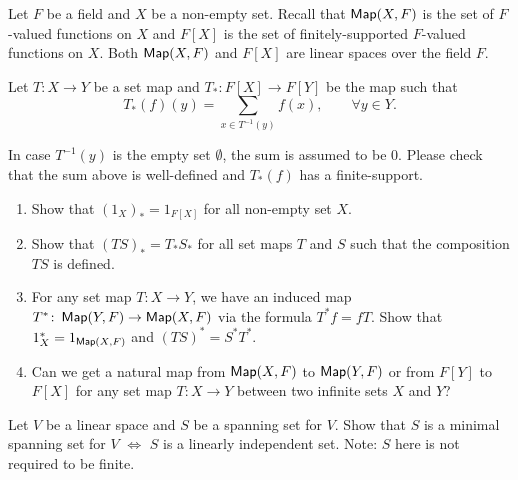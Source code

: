 \begin{problem}\label{prob:function_space_homomorphisms}
  Let $F$ be a field and $X$ be a non-empty set. Recall that $\operatorname{\text{\normalfont\sffamily Map}}(X, F)$ is the set of $F$-valued functions on $X$ and $F[X]$ is the set of finitely-supported $F$-valued functions on $X$. Both $\operatorname{\text{\normalfont\sffamily Map}}(X, F)$ and $F[X]$ are linear spaces over the field $F$.

  Let $T \colon X \to Y$ be a set map and $T_* \colon F[X] \to F[Y]$ be the map such that 
  \[
      T_*(f)(y) = \sum_{x \in T^{-1}(y)} f(x), \qquad \forall y \in Y.
  \]

  In case $T^{-1}(y)$ is the empty set $\emptyset$, the sum is assumed to be 0. Please check that the sum above is well-defined and $T_*(f)$ has a finite-support.
  \begin{enumerate}
    \item Show that ${(1_X)}_* = 1_{F[X]}$ for all non-empty set $X$.
    \item Show that ${(TS)}_* = T_* S_*$ for all set maps $T$ and $S$ such that the composition $TS$ is defined.
    \item For any set map $T \colon X \to Y$, we have an induced map $T^* \colon \operatorname{\text{\normalfont\sffamily Map}}(Y, F) \to \operatorname{\text{\normalfont\sffamily Map}}(X, F)$ via the formula $T^*f = fT$. Show that $1_X^* = 1_{\operatorname{\text{\normalfont\sffamily Map}}(X, F)}$ and ${(TS)}^* = S^*T^*$.
    \item Can we get a natural map from $\operatorname{\text{\normalfont\sffamily Map}}(X, F)$ to $\operatorname{\text{\normalfont\sffamily Map}}(Y, F)$ or from $F[Y]$ to $F[X]$ for any set map $T \colon X \to Y$ between two infinite sets $X$ and $Y$?
  \end{enumerate}
\end{problem}

\begin{problem}
  Let $V$ be a linear space and $S$ be a spanning set for $V$. Show that $S$ is a minimal spanning set for $V$ $\iff$ $S$ is a linearly independent set. Note: $S$ here is not required to be finite.
\end{problem}